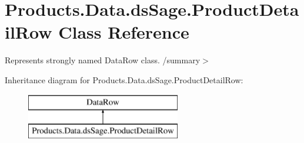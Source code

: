 \hypertarget{class_products_1_1_data_1_1ds_sage_1_1_product_detail_row}{}\section{Products.\+Data.\+ds\+Sage.\+Product\+Detail\+Row Class Reference}
\label{class_products_1_1_data_1_1ds_sage_1_1_product_detail_row}


Represents strongly named Data\+Row class. /summary$>$  


Inheritance diagram for Products.\+Data.\+ds\+Sage.\+Product\+Detail\+Row\+:\begin{figure}[H]
\begin{center}
\leavevmode
\includegraphics[height=2.000000cm]{class_products_1_1_data_1_1ds_sage_1_1_product_detail_row}
\end{center}
\end{figure}

